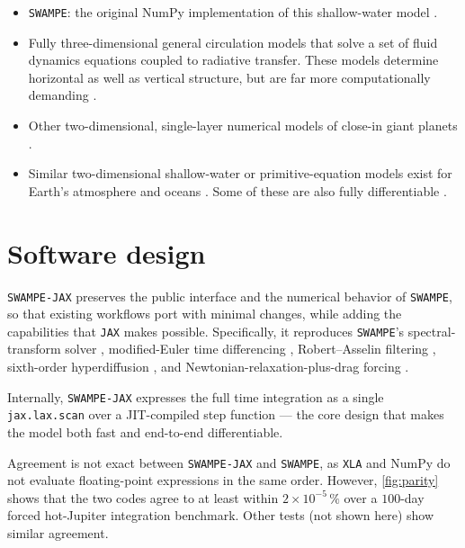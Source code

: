 \documentclass[10pt,a4paper,onecolumn]{article}
\providecommand{\tightlist}{\setlength{\itemsep}{0pt}\setlength{\parskip}{0pt}}
\begin{document}
\begin{itemize}
\tightlist
\item \texttt{SWAMPE}: the original NumPy implementation of this
  shallow-water model \citep{Landgren:2022}.
\item Fully three-dimensional general circulation models that solve a set of fluid
  dynamics equations coupled to radiative transfer. These models determine
  horizontal as well as vertical structure, but are far more computationally
  demanding \citep[e.g.,][]{Showman:2009, Kataria:2016, Carone:2020, Roth:2024}.
\item Other two-dimensional, single-layer numerical models of close-in giant
  planets \citep[e.g.,][]{Cho:2008, Menou:2003, LangtonLaughlin:2008, Penn:2017}.
\item Similar two-dimensional shallow-water or primitive-equation models exist
  for Earth's atmosphere and oceans \citep[e.g.,][]{Klower:2024}. Some of these are also fully
  differentiable \citep[e.g.,][]{Kochkov:2024, Moses:2026, Davenport:2026}.%
\end{itemize}

\section{Software design}

\texttt{SWAMPE-JAX} preserves the public interface and the numerical behavior of
\texttt{SWAMPE}, so that existing workflows port with minimal changes, while
adding the capabilities that \texttt{JAX} makes possible. Specifically, it
reproduces \texttt{SWAMPE}'s spectral-transform solver \citep{Hack:1992},
modified-Euler time differencing \citep{Langton:2008}, Robert--Asselin filtering
\citep{Robert:1966,Asselin:1972}, sixth-order hyperdiffusion \citep{Gelb:2001},
and Newtonian-relaxation-plus-drag forcing \citep{ShowmanGuillot:2002}.

Internally, \texttt{SWAMPE-JAX} expresses the full time integration as a
single \texttt{jax.lax.scan} over a JIT-compiled step function --- the
core design that makes the model both fast and end-to-end differentiable.

Agreement is not exact between \texttt{SWAMPE-JAX} and \texttt{SWAMPE},
as \texttt{XLA} and NumPy do not evaluate
floating-point expressions in the same order. However, \autoref{fig:parity}
shows that the two codes agree to at least within $2\times10^{-5}\,\%$ over a
$100$-day forced hot-Jupiter integration benchmark. Other tests (not shown
here) show similar agreement.
\end{document}
